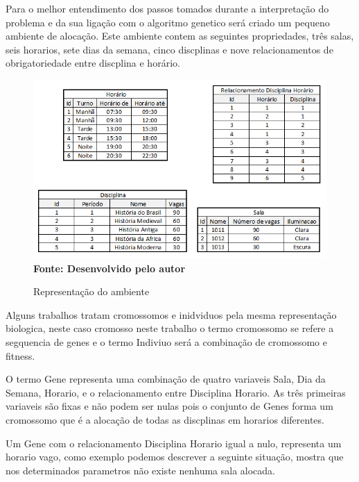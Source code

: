 \documentclass{abntpuc}
\begin{document}
Para o melhor entendimento dos passos tomados durante a interpretação do problema e da sua ligação com o algoritmo genetico será criado um pequeno ambiente de alocação. Este ambiente contem as seguintes propriedades, três salas, seis horarios, sete dias da semana, cinco discplinas e nove relacionamentos de obrigatoriedade entre discplina e horário.\par

\begin{figure}[!htb]
\caption[Representação do ambiente]{Representação do ambiente}
\label{fig:figura4}
\centering
\includegraphics[scale=0.9]{imagens/representacaoAmbiente.png}
\\ \textbf{\footnotesize Fonte: Desenvolvido pelo autor}
\end{figure}




Alguns trabalhos tratam cromossomos e inidviduos pela mesma representação biologica, neste caso cromosso neste trabalho o termo cromossomo se refere a segquencia de genes e o termo Indiviuo será a combinação de cromossomo e fitness.\par

O termo Gene representa uma combinação de quatro variaveis Sala, Dia da Semana, Horario, e o relacionamento entre Disciplina Horario. As três primeiras variaveis são fixas e não podem ser nulas pois o conjunto de Genes forma um cromossomo que é a alocação de todas as discplinas em horarios diferentes.\par

Um Gene com o relacionamento Disciplina Horario igual a nulo, representa um horario vago, como exemplo podemos descrever a seguinte situação, mostra que nos determinados parametros não existe nenhuma sala alocada.\par
\end{document}
